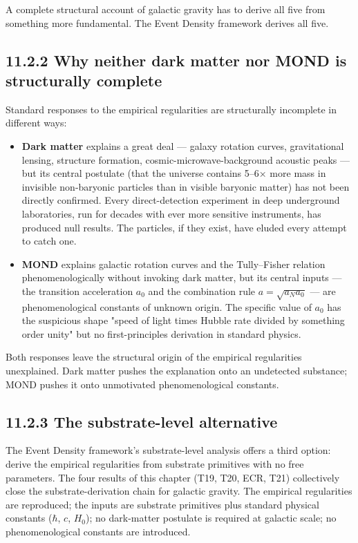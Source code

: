 \documentclass[11pt]{book}
\begin{document}
A complete structural account of galactic gravity has to derive all five from something more fundamental. The Event Density framework derives all five.

\subsection{11.2.2 Why neither dark matter nor MOND is structurally complete}

Standard responses to the empirical regularities are structurally incomplete in different ways:

\begin{itemize}
\item \textbf{Dark matter} explains a great deal — galaxy rotation curves, gravitational lensing, structure formation, cosmic-microwave-background acoustic peaks — but its central postulate (that the universe contains 5–6× more mass in invisible non-baryonic particles than in visible baryonic matter) has not been directly confirmed. Every direct-detection experiment in deep underground laboratories, run for decades with ever more sensitive instruments, has produced null results. The particles, if they exist, have eluded every attempt to catch one.
\item \textbf{MOND} explains galactic rotation curves and the Tully–Fisher relation phenomenologically without invoking dark matter, but its central inputs — the transition acceleration $a_0$ and the combination rule $a = \sqrt{a_N a_0}$ — are phenomenological constants of unknown origin. The specific value of $a_0$ has the suspicious shape "speed of light times Hubble rate divided by something order unity" but no first-principles derivation in standard physics.
\end{itemize}

Both responses leave the structural origin of the empirical regularities unexplained. Dark matter pushes the explanation onto an undetected substance; MOND pushes it onto unmotivated phenomenological constants.

\subsection{11.2.3 The substrate-level alternative}

The Event Density framework's substrate-level analysis offers a third option: derive the empirical regularities from substrate primitives with no free parameters. The four results of this chapter (T19, T20, ECR, T21) collectively close the substrate-derivation chain for galactic gravity. The empirical regularities are reproduced; the inputs are substrate primitives plus standard physical constants ($\hbar$, $c$, $H_0$); no dark-matter postulate is required at galactic scale; no phenomenological constants are introduced.
\end{document}
